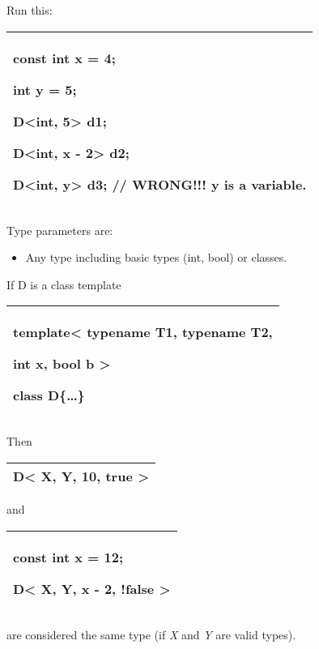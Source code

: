 \documentclass[
]{article}
\providecommand{\tightlist}{%
  \setlength{\itemsep}{0pt}\setlength{\parskip}{0pt}}
\begin{document}
Run this:

\begin{longtable}[]{@{}l@{}}
\toprule
\endhead
\begin{minipage}[t]{0.97\columnwidth}\raggedright
const int x = 4;

int y = 5;

D\textless int, 5\textgreater{} d1;

D\textless int, x - 2\textgreater{} d2;

D\textless int, y\textgreater{} d3; // \textbf{WRONG!!! y is a
variable.}\strut
\end{minipage}\tabularnewline
\bottomrule
\end{longtable}

Type parameters are:

\begin{itemize}
\tightlist
\item
  Any type including basic types (int, bool) or classes.
\end{itemize}

If D is a class template

\begin{longtable}[]{@{}l@{}}
\toprule
\endhead
\begin{minipage}[t]{0.97\columnwidth}\raggedright
template\textless{} typename T1, typename T2,

int x, bool b \textgreater{}

class D\{\ldots\}\strut
\end{minipage}\tabularnewline
\bottomrule
\end{longtable}

Then

\begin{longtable}[]{@{}l@{}}
\toprule
\endhead
D\textless{} X, Y, 10, true \textgreater{}\tabularnewline
\bottomrule
\end{longtable}

and

\begin{longtable}[]{@{}l@{}}
\toprule
\endhead
\begin{minipage}[t]{0.97\columnwidth}\raggedright
const int x = 12;

D\textless{} X, Y, x - 2, !false \textgreater{}\strut
\end{minipage}\tabularnewline
\bottomrule
\end{longtable}

are considered the same type (if \emph{X} and \emph{Y} are valid types).
\end{document}
